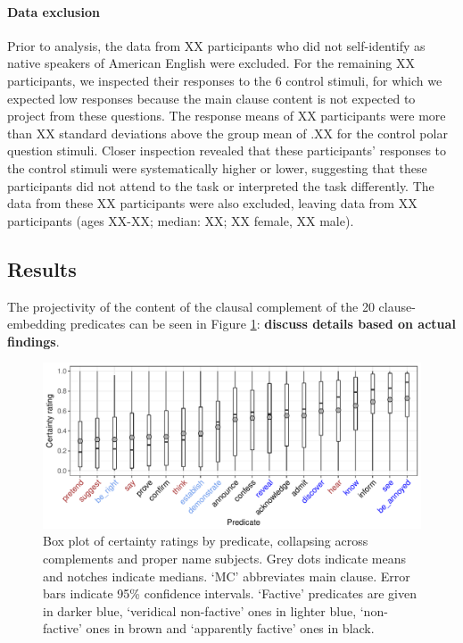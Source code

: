 \documentclass[11pt,fleqn]{article}
\newcommand{\6}{\mbox{$[\hspace*{-.6mm}[$}}
\newcommand{\9}{\mbox{$]\hspace*{-.6mm}]$}}
\begin{document}
\paragraph{Data exclusion}
Prior to analysis, the data from XX participants who did not self-identify as native speakers of American English were excluded. For the remaining XX participants, we inspected their responses to the 6 control stimuli, for which we expected low responses because the main clause content is not expected to project from these questions. The response means of XX participants were more than XX standard deviations above the group mean of .XX for the control polar question stimuli. Closer inspection revealed that these participants' responses to the control stimuli were systematically higher or lower, suggesting that these participants did not attend to the task or interpreted the task differently. The data from these XX participants were also excluded, leaving data from XX participants (ages XX-XX; median: XX; XX female, XX male).

\subsection{Results}

The projectivity of the content of the clausal complement of the 20 clause-embedding predicates can be seen in Figure \ref{f-projectivity}: {\bf discuss details based on actual findings}.

\begin{figure}[H]
\centering

\includegraphics[width=.8\paperwidth]{../results/3-projectivity/graphs/boxplot-projectivity-factH}

\caption{Box plot of certainty ratings by predicate, collapsing across complements and proper name subjects. Grey dots indicate means and notches indicate medians. `MC' abbreviates main clause. Error bars indicate 95\% confidence intervals. `Factive' predicates are given in darker blue, `veridical non-factive' ones in lighter blue, `non-factive' ones in brown and `apparently factive' ones in black.}
\label{f-projectivity}
\end{figure}
\end{document}
